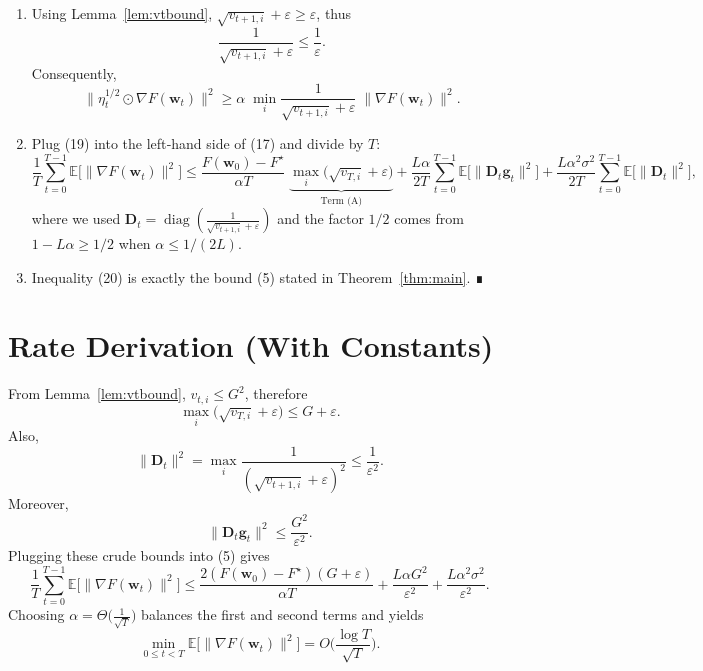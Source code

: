 \documentclass{article}
\newcommand{\E}{\mathbb{E}}
\begin{document}
\begin{enumerate}
\item[{\bf [Step 14]}] Using Lemma~\ref{lem:vtbound}, $\sqrt{v_{t+1,i}}+\varepsilon\ge\varepsilon$, thus
\[
\frac{1}{\sqrt{v_{t+1,i}}+\varepsilon}\le\frac{1}{\varepsilon}.
\]
Consequently,
\[
\|\eta_{t}^{1/2}\odot\nabla F(\mathbf w_{t})\|^{2}
\ge \alpha\;\min_{i}\frac{1}{\sqrt{v_{t+1,i}}+\varepsilon}\;\|\nabla F(\mathbf w_{t})\|^{2}.
\tag{19}
\]

\item[{\bf [Step 15]}] Plug (19) into the left‑hand side of (17) and divide by $T$:
\[
\frac{1}{T}\sum_{t=0}^{T-1}\E\!\big[\|\nabla F(\mathbf w_{t})\|^{2}\big]
\le
\frac{F(\mathbf w_{0})-F^{\star}}{\alpha T}\;
\underbrace{\max_{i}\big(\sqrt{v_{T,i}}+\varepsilon\big)}_{\displaystyle\text{Term (A)}}
+ \frac{L\alpha}{2T}\sum_{t=0}^{T-1}\E\!\big[\|\mathbf D_{t}\mathbf g_{t}\|^{2}\big]
+ \frac{L\alpha^{2}\sigma^{2}}{2T}\sum_{t=0}^{T-1}\E\!\big[\|\mathbf D_{t}\|^{2}\big],
\tag{20}
\]
where we used $\mathbf D_{t}= \operatorname{diag}(\frac{1}{\sqrt{v_{t+1,i}}+\varepsilon})$ and the factor $1/2$ comes from $1-L\alpha\ge 1/2$ when $\alpha\le 1/(2L)$.

\item[{\bf [Step 16]}] Inequality (20) is exactly the bound (5) stated in Theorem~\ref{thm:main}. ∎
\end{enumerate}

\section*{Rate Derivation (With Constants)}
From Lemma~\ref{lem:vtbound}, $v_{t,i}\le G^{2}$, therefore
\[
\max_{i}\big(\sqrt{v_{T,i}}+\varepsilon\big)\le G+\varepsilon.
\]
Also,
\[
\|\mathbf D_{t}\|^{2}= \max_{i}\frac{1}{(\sqrt{v_{t+1,i}}+\varepsilon)^{2}}\le\frac{1}{\varepsilon^{2}}.
\]
Moreover,
\[
\|\mathbf D_{t}\mathbf g_{t}\|^{2}\le\frac{G^{2}}{\varepsilon^{2}}.
\]
Plugging these crude bounds into (5) gives
\[
\frac{1}{T}\sum_{t=0}^{T-1}\E\!\big[\|\nabla F(\mathbf w_{t})\|^{2}\big]
\le
\frac{2(F(\mathbf w_{0})-F^{\star})(G+\varepsilon)}{\alpha T}
+ \frac{L\alpha G^{2}}{ \varepsilon^{2}}
+ \frac{L\alpha^{2}\sigma^{2}}{ \varepsilon^{2}}.
\]
Choosing $\alpha = \Theta\!\big(\frac{1}{\sqrt{T}}\big)$ balances the first and second terms and yields
\[
\min_{0\le t<T}\E\!\big[\|\nabla F(\mathbf w_{t})\|^{2}\big]
= O\!\Big(\frac{\log T}{\sqrt{T}}\Big).
\]
\end{document}
